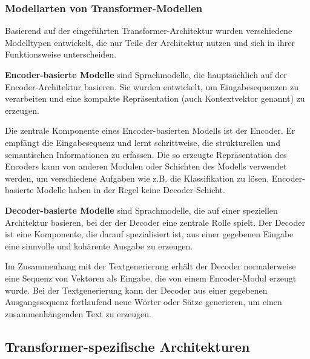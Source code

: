 \subsubsection{Modellarten von Transformer-Modellen}

Basierend auf der eingeführten Transformer-Architektur wurden verschiedene Modelltypen entwickelt, die nur Teile der Architektur nutzen und sich in ihrer Funktionsweise unterscheiden.

\begin{definition}\label{def:encoder-basierte-modelle}
    \textbf{Encoder-basierte Modelle} sind Sprachmodelle, die hauptsächlich auf der Encoder-Architektur basieren.
    Sie wurden entwickelt, um Eingabesequenzen zu verarbeiten und eine kompakte Repräsentation (auch Kontextvektor genannt) zu erzeugen.
\end{definition}
Die zentrale Komponente eines Encoder-basierten Modells ist der Encoder.
Er empfängt die Eingabesequenz und lernt schrittweise, die strukturellen und semantischen Informationen zu erfassen.
Die so erzeugte Repräsentation des Encoders kann von anderen Modulen oder Schichten des Modells verwendet werden, um verschiedene Aufgaben 
wie z.B. die Klassifikation zu lösen.
Encoder-basierte Modelle haben in der Regel keine Decoder-Schicht.\\

\begin{definition}\label{def:decoder-basierte-modelle}
    \textbf{Decoder-basierte Modelle} sind Sprachmodelle, die auf einer speziellen Architektur basieren, bei der der Decoder eine zentrale Rolle spielt.
    Der Decoder ist eine Komponente, die darauf spezialisiert ist, aus einer gegebenen Eingabe eine sinnvolle und kohärente Ausgabe zu erzeugen.
\end{definition}
Im Zusammenhang mit der Textgenerierung erhält der Decoder normalerweise eine Sequenz von Vektoren als Eingabe, die von einem Encoder-Modul erzeugt wurde.
Bei der Textgenerierung kann der Decoder aus einer gegebenen Ausgangssequenz fortlaufend neue Wörter oder Sätze generieren, um einen zusammenhängenden Text zu erzeugen.

\subsection{Transformer-spezifische Architekturen}

